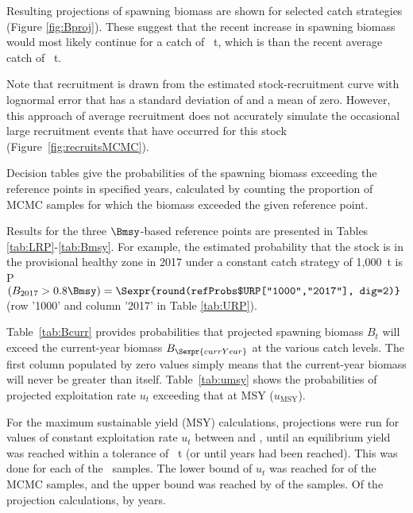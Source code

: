 Resulting projections of spawning biomass are shown for selected catch strategies (Figure \ref{fig:Bproj}). These suggest that the recent increase in spawning biomass would most likely continue for a catch of ~t, which is  than the recent average catch of ~t. 

Note that recruitment is drawn from the estimated stock-recruitment curve with lognormal error that has a standard deviation of  and a mean of zero. However, this approach of average recruitment does not accurately simulate the occasional large recruitment events that have occurred for this stock (Figure~\ref{fig:recruitsMCMC}).

Decision tables give the probabilities of the spawning biomass exceeding the reference points in specified years, calculated by counting the proportion of MCMC samples for which the biomass exceeded the given reference point.

Results for the three $\Bmsy$-based reference points are presented in Tables \ref{tab:LRP}-\ref{tab:Bmsy}. For example, the estimated probability that the stock is in the provisional healthy zone in 2017 under a constant catch strategy of 1,000~t is P$(B_{2017} > 0.8 \Bmsy)=\Sexpr{round(refProbs$URP["1000","2017"], dig=2)}$ (row '1000' and column '2017' in Table \ref{tab:URP}). 

Table~\ref{tab:Bcurr} provides probabilities that projected spawning biomass $B_t$ will exceed the current-year biomass $B_{\Sexpr{currYear}}$ at the various catch levels. The first column populated by zero values simply means that the current-year biomass will never be greater than itself. Table~\ref{tab:umsy} shows the probabilities of projected exploitation rate $u_t$ exceeding that at MSY ($u_\mathrm{MSY}$).

For the maximum sustainable yield (MSY) calculations, projections were run for  values of constant exploitation rate $u_t$ between  and , until an equilibrium yield was reached within a tolerance of ~t (or until  years had been reached). This was done for each of the \numMCMC~samples.
The lower bound of $u_t$ was reached for  of the MCMC samples, and the upper bound was reached by  of the samples.
Of the  projection calculations,  by  years.


